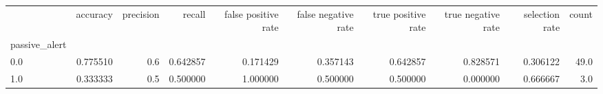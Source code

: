 \begin{tabular}{lrrrrrrrrr}
\toprule
{} &  accuracy &  precision &    recall &  false positive rate &  false negative rate &  true positive rate &  true negative rate &  selection rate &  count \\
passive\_alert &           &            &           &                      &                      &                     &                     &                 &        \\
\midrule
0.0           &  0.775510 &        0.6 &  0.642857 &             0.171429 &             0.357143 &            0.642857 &            0.828571 &        0.306122 &   49.0 \\
1.0           &  0.333333 &        0.5 &  0.500000 &             1.000000 &             0.500000 &            0.500000 &            0.000000 &        0.666667 &    3.0 \\
\bottomrule
\end{tabular}
